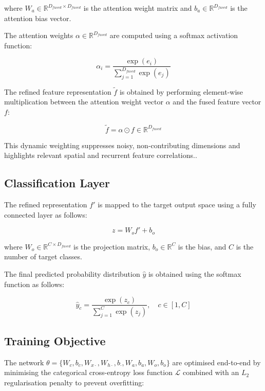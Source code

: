 \documentclass[a4paper,fleqn]{cas-sc}
\begin{document}
where $W_a \in \mathbb{R}^{D_{fused} \times D_{fused}}$ is the attention weight matrix and $b_a \in \mathbb{R}^{D_{fused}}$ is the attention bias vector.

The attention weights $\alpha \in \mathbb{R}^{D_{fused}}$ are computed using a softmax activation function:

\begin{equation}
\alpha_i = \frac{\exp(e_i)}{\sum_{j=1}^{D_{fused}} \exp(e_j)}
\end{equation}

The refined feature representation $\tilde{f}$ is obtained by performing element-wise multiplication between the attention weight vector $\alpha$ and the fused feature vector $f$:

\begin{equation}
\tilde{f} = \alpha \odot f \in \mathbb{R}^{D_{fused}}
\end{equation}

This dynamic weighting suppresses noisy, non-contributing dimensions and highlights relevant spatial and recurrent feature correlations..

\subsection{Classification Layer}

The refined representation $f'$ is mapped to the target output space using a fully connected layer as follows:

\begin{equation}
z = W_o f' + b_o
\end{equation}

where $W_o \in \mathbb{R}^{C \times D_{fused}}$ is the projection matrix, $b_o \in \mathbb{R}^{C}$ is the bias, and $C$ is the number of target classes.

The final predicted probability distribution $\hat{y}$ is obtained using the softmax function as follows:

\begin{equation}
\hat{y}_c = \frac{\exp(z_c)}{\sum_{j=1}^{C} \exp(z_j)}, \quad c \in [1, C]
\end{equation}

\subsection{Training Objective}

The network $\theta = \{W_c, b_c, W_{x\cdot}, W_{h\cdot}, b_{\cdot}, W_a, b_a, W_o, b_o\}$ are optimised end-to-end by minimising the categorical cross-entropy loss function $\mathcal{L}$ combined with an $L_2$ regularisation penalty to prevent overfitting:
\end{document}
